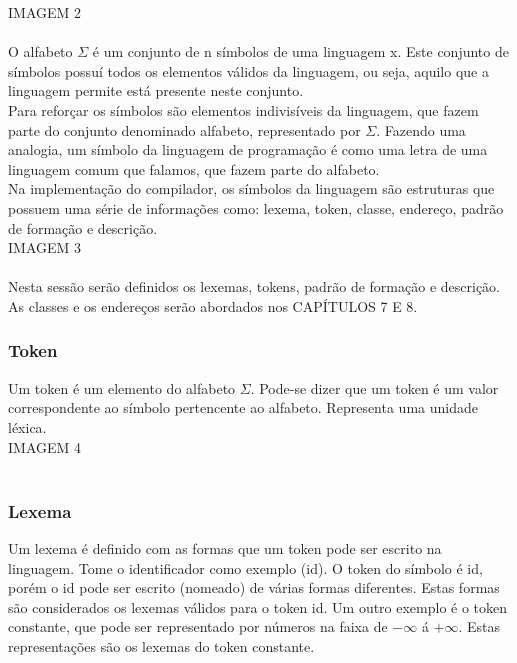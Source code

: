 IMAGEM 2\\ \\

O alfabeto $\Sigma$ é um conjunto de n símbolos de uma linguagem x. Este conjunto de símbolos possuí todos os elementos válidos da linguagem, ou seja, aquilo que a linguagem permite está presente neste conjunto.\\

Para reforçar os símbolos são elementos indivisíveis da linguagem, que fazem parte do conjunto denominado alfabeto, representado por $\Sigma$. Fazendo uma analogia, um símbolo da linguagem de programação é como uma letra de uma linguagem comum que falamos, que fazem parte do alfabeto.\\

Na implementação do compilador, os símbolos da linguagem são estruturas que possuem uma série de informações como: lexema, token, classe, endereço, padrão de formação e descrição.\\

IMAGEM 3\\ \\

Nesta sessão serão definidos os lexemas, tokens, padrão de formação e descrição. As classes e os endereços serão abordados nos CAPÍTULOS 7 E 8. \\

\subsubsection{Token}
Um token é um elemento do alfabeto $\Sigma$. Pode-se dizer que um token é um valor correspondente ao símbolo pertencente ao alfabeto. Representa uma unidade léxica. \\

IMAGEM 4\\ \\

\subsubsection{Lexema}
Um lexema é definido com as formas que um token pode ser escrito na linguagem. Tome o identificador como exemplo (id). O token do símbolo é id, porém o id pode ser escrito (nomeado) de várias formas diferentes. Estas formas são considerados os lexemas válidos para o token id. Um outro exemplo é o token constante, que pode ser representado por números na faixa de $-\infty$ á $+\infty$. Estas representações são os lexemas do token constante.\\


